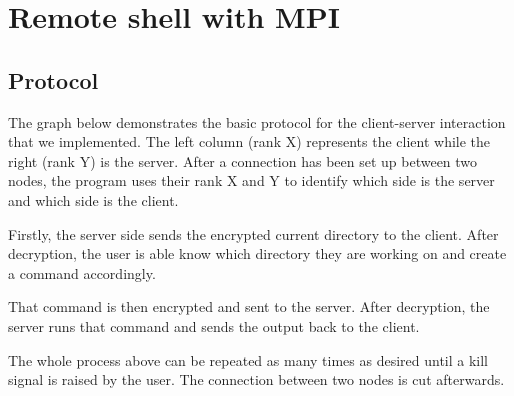 \section{Remote shell with MPI}

\subsection{Protocol}

The graph below demonstrates the basic protocol for the client-server interaction that we implemented. The left column (rank X) represents the client while the right (rank Y) is the server. After a connection has been set up between two nodes, the program uses their rank X and Y to identify which side is the server and which side is the client.

Firstly, the server side sends the encrypted current directory to the client. After decryption, the user is able know which directory they are working on and create a command accordingly.

That command is then encrypted and sent to the server. After decryption, the server runs that command and sends the output back to the client.

The whole process above can be repeated as many times as desired until a kill signal is raised by the user. The connection between two nodes is cut afterwards.

